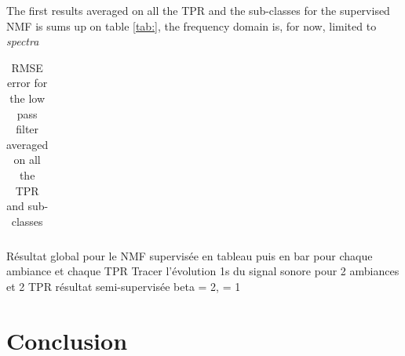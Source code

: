 \documentclass[twocolumn,a4paper,10pt]{article}
\begin{document}
The first results averaged on all the TPR and the sub-classes for the supervised NMF is sums up on table \ref{tab:}, the frequency domain is, for now, limited to \textit{spectra}

\begin{table}[h]
\centering
\begin{tabular}{lll}

\end{tabular}
\caption{RMSE error for the low pass filter averaged on all the TPR and sub-classes}
\label{tab:results_filter}
\end{table}


Résultat global pour le NMF supervisée en tableau puis en bar pour chaque ambiance et chaque TPR
Tracer l'évolution 1s du signal sonore pour 2 ambiances et 2 TPR
résultat semi-supervisée
beta = 2, = 1
%

\section{Conclusion}
\footnotesize


\end{document}

